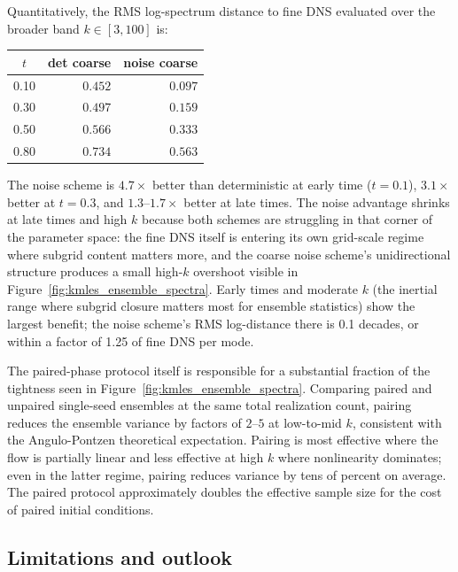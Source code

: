 \documentclass[11pt,letterpaper]{article}
\begin{document}
Quantitatively, the RMS log-spectrum distance to fine DNS evaluated over the broader band $k \in [3, 100]$ is:

\begin{center}
\begin{tabular}{crr}
\toprule
$t$ & det coarse & noise coarse \\
\midrule
0.10 & $0.452$ & $0.097$ \\
0.30 & $0.497$ & $0.159$ \\
0.50 & $0.566$ & $0.333$ \\
0.80 & $0.734$ & $0.563$ \\
\bottomrule
\end{tabular}
\end{center}

The noise scheme is $4.7 \times$ better than deterministic at early time ($t = 0.1$), $3.1 \times$ better at $t = 0.3$, and $1.3\text{--}1.7\times$ better at late times. The noise advantage shrinks at late times and high $k$ because both schemes are struggling in that corner of the parameter space: the fine DNS itself is entering its own grid-scale regime where subgrid content matters more, and the coarse noise scheme's unidirectional structure produces a small high-$k$ overshoot visible in Figure~\ref{fig:kmles_ensemble_spectra}. Early times and moderate $k$ (the inertial range where subgrid closure matters most for ensemble statistics) show the largest benefit; the noise scheme's RMS log-distance there is 0.1 decades, or within a factor of 1.25 of fine DNS per mode.

The paired-phase protocol itself is responsible for a substantial fraction of the tightness seen in Figure~\ref{fig:kmles_ensemble_spectra}. Comparing paired and unpaired single-seed ensembles at the same total realization count, pairing reduces the ensemble variance by factors of $2$--$5$ at low-to-mid $k$, consistent with the Angulo-Pontzen theoretical expectation. Pairing is most effective where the flow is partially linear and less effective at high $k$ where nonlinearity dominates; even in the latter regime, pairing reduces variance by tens of percent on average. The paired protocol approximately doubles the effective sample size for the cost of paired initial conditions.

\subsection{Limitations and outlook}
\label{sec:kmles:limitations}
\end{document}
